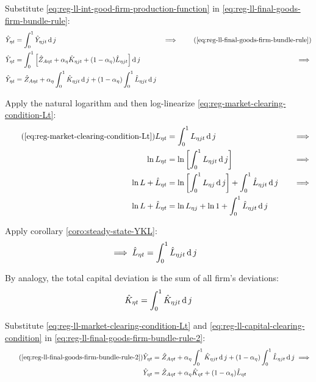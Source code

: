 \documentclass[../thesis.tex]{subfiles}
\begin{document}
Substitute \ref{eq:reg-ll-int-good-firm-production-function} in \ref{eq:reg-ll-final-goods-firm-bundle-rule}:
\begin{alignat}{2}
	\hat{Y}_{\eta t} &= \int_{0}^{1} \hat{Y}_{\eta jt} \dif j &\implies \tag{\ref{eq:reg-ll-final-goods-firm-bundle-rule}} \\
	\hat{Y}_{\eta t} &= \int_{0}^{1} \left[ \hat{Z}_{A\eta t} + {\alpha_{\eta}} \hat{K}_{\eta jt} + (1-{\alpha_{\eta}}) \hat{L}_{\eta jt} \right] \dif j &\implies \nonumber \\
	\hat{Y}_{\eta t} &= \hat{Z}_{A\eta t} + {\alpha_{\eta}} \int_{0}^{1} \hat{K}_{\eta jt} \dif j + (1-{\alpha_{\eta}}) \int_{0}^{1} \hat{L}_{\eta jt} \dif j \label{eq:reg-ll-final-goods-firm-bundle-rule-2}
\end{alignat}

Apply the natural logarithm and then log-linearize \ref{eq:reg-market-clearing-condition-Lt}:
\begin{alignat}{2}
	\tag{\ref{eq:reg-market-clearing-condition-Lt}}
	L_{\eta t} &= \int_{0}^{1} L_{\eta jt} \dif j &\implies \\
	\ln L_{\eta t} &= \ln \left[ \int_{0}^{1} L_{\eta jt} \dif j \right] &\implies \nonumber \\
	\ln L + \hat{L}_{\eta t} &= \ln \left[ \int_{0}^{1} L_{\eta j} \dif j \right] + \int_{0}^{1} \hat{L}_{\eta jt} \dif j \quad &\implies \nonumber \\
	\ln L + \hat{L}_{\eta t} &= \ln L_{\eta j} + \ln 1 + \int_{0}^{1} \hat{L}_{\eta jt} \dif j \nonumber
\end{alignat}

Apply corollary \ref{coro:steady-state-YKL}:
\begin{align}
	\implies \hat{L}_{\eta t} &= \int_{0}^{1} \hat{L}_{\eta jt} \operatorname{d} j \label{eq:reg-ll-market-clearing-condition-Lt}
\end{align}

By analogy, the total capital deviation is the sum of all firm's deviations:
\begin{align}
	\hat{K}_{\eta t} = \int_{0}^{1} \hat{K}_{\eta jt} \operatorname{d} j \label{eq:reg-ll-capital-clearing-condition}
\end{align}

Substitute \ref{eq:reg-ll-market-clearing-condition-Lt} and \ref{eq:reg-ll-capital-clearing-condition} in \ref{eq:reg-ll-final-goods-firm-bundle-rule-2}:
\begin{align}
	\tag{\ref{eq:reg-ll-final-goods-firm-bundle-rule-2}}
	\hat{Y}_{\eta t} &= \hat{Z}_{A\eta t} + {\alpha_{\eta}} \int_{0}^{1} \hat{K}_{\eta jt} \dif j + (1-{\alpha_{\eta}}) \int_{0}^{1} \hat{L}_{\eta jt} \dif j \implies \\
	\hat{Y}_{\eta t} &= \hat{Z}_{A\eta t} + {\alpha_{\eta}} \hat{K}_{\eta t} + (1-{\alpha_{\eta}}) \hat{L}_{\eta t} \label{eq:reg-ll-final-goods-firm-bundle-rule-3}
\end{align}
\end{document}
